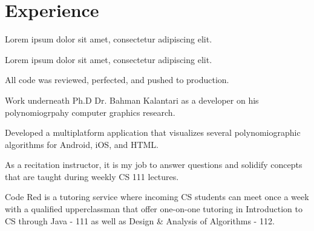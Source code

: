 \documentclass[]{deedy-resume-openfont}
\begin{document}
\hfill
\begin{minipage}[t]{0.66\textwidth} 


\section{Experience}

\vspace{\topsep} %
\begin{tightemize}
\item Lorem ipsum dolor sit amet, consectetur adipiscing elit.
\item Lorem ipsum dolor sit amet, consectetur adipiscing elit.
\item All code was reviewed, perfected, and pushed to production.
\end{tightemize}
\sectionsep

\begin{tightemize}
\item Work underneath Ph.D Dr. Bahman Kalantari as a developer on his polynomiogrpahy computer graphics research.
\item Developed a multiplatform application that visualizes several polynomiographic algorithms for Android, iOS, and HTML.

\end{tightemize}
\sectionsep

\begin{tightemize}
\item As a recitation instructor, it is my job to answer questions and solidify concepts that are taught during weekly CS 111 lectures.
\item Code Red is a tutoring service where incoming CS students can meet once a week with a qualified upperclassman that offer one-on-one tutoring in Introduction to CS through Java - 111 as well as Design \& Analysis of Algorithms - 112. 
\end{tightemize}
\sectionsep


\end{minipage}
\end{document}
